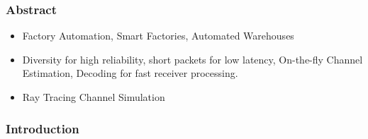 \documentclass[11pt]{article}
\begin{document}
\subsubsection{Abstract}
\label{sec:orgfe3e0b6}
\begin{itemize}
\item Factory Automation, Smart Factories, Automated Warehouses
\item Diversity for high reliability, short packets for low latency,  On-the-fly Channel Estimation, Decoding for fast receiver processing.
\item Ray Tracing Channel Simulation
\end{itemize}
\subsubsection{Introduction}
\label{sec:org1a2363d}
\end{document}
